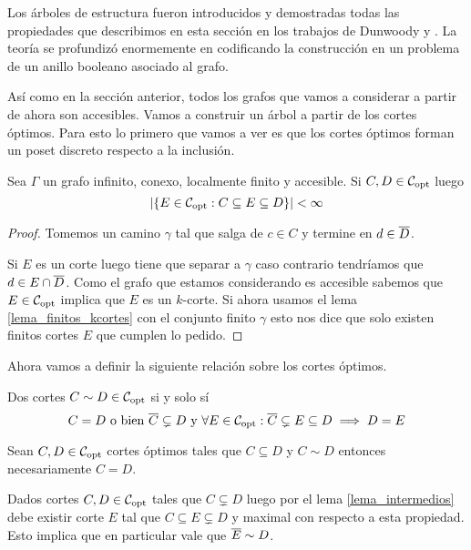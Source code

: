 \documentclass[tesis.tex]{subfiles}
\begin{document}
Los árboles de estructura fueron introducidos y demostradas todas las propiedades que describimos en esta sección en los trabajos de Dunwoody \cite{dunwoody1979accessibility} y \cite{dunwoody1982cutting}.
La teoría se profundizó enormemente en \cite{dicks1989groups} codificando la construcción en un problema de un anillo booleano asociado al grafo. 

Así como en la sección anterior, todos los grafos que vamos a considerar a partir de ahora son accesibles.
Vamos a construir un árbol a partir de los cortes óptimos.
Para esto lo primero que vamos a ver es que los cortes óptimos forman un poset discreto respecto a la inclusión.

\begin{lema}\label{lema_intermedios}
	Sea $\Gamma$ un grafo infinito, conexo, localmente finito y accesible.
	Si $C,D \in {\cal C}_{\text{opt}}$ luego 
	\[
	|\{ E \in {\cal C}_{\text{opt}} : C \subseteq E \subseteq D \}| < \infty
	\]
\end{lema}
\begin{proof}
	Tomemos un camino $\gamma$ tal que salga de $c \in C$ y termine en $d \in \overline D$.
	
	Si $E$ es un corte luego tiene que separar a $\gamma$ caso contrario tendríamos que $d \in E \cap \overline D$.
	Como el grafo que estamos considerando es accesible sabemos que $E \in {\cal C}_{\text{opt}}$ implica que $E$ es un $k$-corte.
	Si ahora usamos el lema \ref{lema_finitos_kcortes} con el conjunto finito $\gamma$ esto nos dice que solo existen finitos cortes $E$ que cumplen lo pedido.
\end{proof}


Ahora vamos a definir la siguiente relación sobre los cortes óptimos.

\begin{deff}
	Dos cortes $C \sim D \in {\cal C}_{\text{opt}}$ si y solo sí
	\[
		C = D \ \text{o bien} \ \overline C \subsetneq D \ \text{y} \ \forall E \in {\cal C}_{\text{opt}} : \overline C \subsetneq E \subseteq D \implies D = E
	\]
\end{deff}

\begin{obs}\label{obs_copt_igualdad}
	Sean $C,D \in {\cal C}_{\text{opt}}$ cortes óptimos tales que $C \subseteq D$ y $C \sim D$ entonces necesariamente $C = D$.
\end{obs}

\begin{obs}\label{obs_cortes_maximal}
	Dados cortes $C,D \in {\cal C}_{\text{opt}}$ tales que $C \subsetneq D$ luego por el lema \ref{lema_intermedios} debe existir corte $E$ tal que $C \subseteq E \subsetneq D$ y maximal con respecto a esta propiedad. 
	Esto implica que en particular vale que $\overline E \sim D$.
\end{obs}
\end{document}

